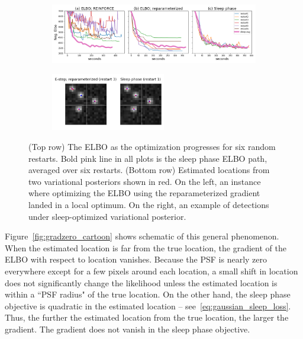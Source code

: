 \begin{figure}[!htb]
    \centering
    \begin{subfigure}[t]{0.9\textwidth}
    \centering
    \includegraphics[width=\textwidth]{figures/optim_path_compare.png}
    \end{subfigure}
    \begin{subfigure}[t]{\textwidth}
    \centering
    \includegraphics[width=0.55\textwidth]{figures/optim_path_detect_compare.png}
    \end{subfigure}
    \vspace{-3em}
    \caption{(Top row) The ELBO as the optimization progresses 
    for six random restarts. 
    Bold pink line in all plots is the sleep phase ELBO path, averaged over six restarts. 
    (Bottom row) Estimated locations from two variational posteriors shown in red. On the left, an instance where optimizing the ELBO using the reparameterized gradient landed in a local optimum.
    On the right, an example of detections under 
    sleep-optimized variational posterior. }
    \label{fig:optim_path}
\end{figure}

Figure~\ref{fig:gradzero_cartoon} shows schematic of this general phenomenon. When the estimated location is far from the true location, the gradient of the ELBO with respect to location vanishes. Because the PSF is nearly zero everywhere except for a few pixels around each location, a small shift in location does not significantly change the likelihood unless the estimated location is within a ``PSF radius" of the true location. On the other hand, the sleep phase objective is quadratic in the estimated location -- see~\eqref{eq:gaussian_sleep_loss}. Thus, the further the estimated location from the true location, the larger the gradient. The gradient does not vanish in the sleep phase objective. 

